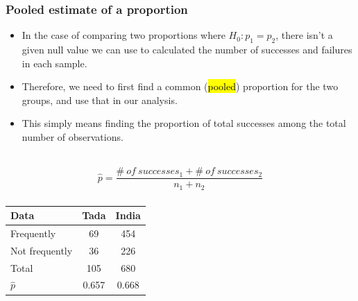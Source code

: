 \documentclass[notes,11pt, aspectratio=169]{beamer}
\begin{document}
\begin{frame}
\frametitle{Pooled estimate of a proportion}

\begin{itemize}

\item In the case of comparing two proportions where $H_0: p_1 = p_2$, there isn't a given null value we can use to calculated the  number of successes and failures in each sample.

\pause

\item Therefore, we need to first find a common (\hl{pooled}) proportion for the two groups, and use that in our analysis.

\pause

\item This simply means finding the proportion of total successes among the total number of observations.

\end{itemize}

$\:$ \\

{ \[ \hat{p} = \frac{\#~of~successes_1 + \#~of~successes_2}{n_1 + n_2} \] }

\end{frame}


\begin{frame}
\frametitle{}


{\footnotesize
\begin{center}
\begin{tabular}{l | c c}
Data			& Tada		& India \\
\hline
Frequently	& 69			& 454 \\
Not frequently     & 36			& 226 \\
\hline
Total			& 105		& 680 \\
\hline
$\hat{p}$		& 0.657		& 0.668
\end{tabular}
\end{center}
}

\pause


\end{frame}
\end{document}
